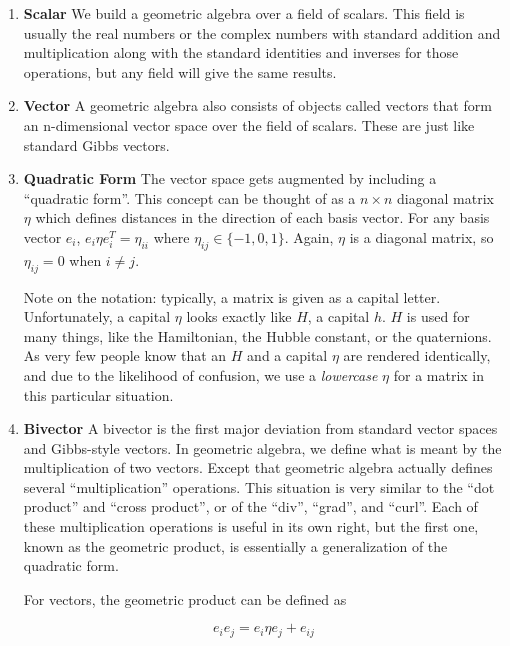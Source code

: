 \documentclass[8pt]{article}
\begin{document}
\begin{enumerate}

  \item \textbf{Scalar}
        We build a geometric algebra over a field of scalars. This field is usually the real numbers or the complex numbers with standard addition and multiplication along with the standard identities and inverses for those operations, but any field will give the same results.

  \item \textbf{Vector}
        A geometric algebra also consists of objects called vectors that form an n-dimensional vector space over the field of scalars. These are just like standard Gibbs vectors.

  \item \textbf{Quadratic Form}
        The vector space gets augmented by including a ``quadratic form''. This concept can be thought of as a $n \times n$ diagonal matrix $\eta$ which defines distances in the direction of each basis vector. For any basis vector $e_i$, $e_i \eta e_i^T = \eta_{ii}$ where $\eta_{ij} \in \{-1,0,1\}$. Again, $\eta$ is a diagonal matrix, so $\eta_{ij} = 0$ when $i \neq j$.

        Note on the notation: typically, a matrix is given as a capital letter. Unfortunately, a capital $\eta$ looks exactly like $H$, a capital $h$. $H$ is used for many things, like the Hamiltonian, the Hubble constant, or the quaternions. As very few people know that an $H$ and a capital $\eta$ are rendered identically, and due to the likelihood of confusion, we use a \emph{lowercase} $\eta$ for a matrix in this particular situation.

  \item \textbf{Bivector}
        A bivector is the first major deviation from standard vector spaces and Gibbs-style vectors. In geometric algebra, we define what is meant by the multiplication of two vectors. Except that geometric algebra actually defines several ``multiplication'' operations. This situation is very similar to the ``dot product'' and ``cross product'', or of the ``div'', ``grad'', and ``curl''. Each of these multiplication operations is useful in its own right, but the first one, known as the geometric product, is essentially a generalization of the quadratic form.

        For vectors, the geometric product can be defined as

        \[
        e_i e_j = e_i \eta e_j + e_{ij}
        \]


\end{enumerate}
\end{document}
